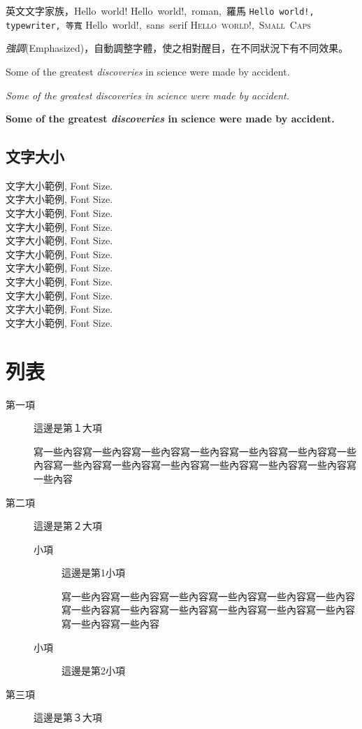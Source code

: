 \hbox{英文文字家族，Hello world!}
{\LARGE
    \hbox{\textrm{Hello world!, roman, 羅馬}}
    \hbox{\texttt{Hello world!, typewriter, 等寬}}
    \hbox{\textsf{Hello world!, sans serif}}
    \hbox{\textsc{Hello world!, Small Caps}}
}

\emph{強調}(Emphasized)，自動調整字體，使之相對醒目，在不同狀況下有不同效果。

Some of the greatest \emph{discoveries}
in science
were made by accident.

\textit{Some of the greatest \emph{discoveries}
    in science
    were made by accident.}

\textbf{Some of the greatest \emph{discoveries}
    in science
    were made by accident.}

\subsection{文字大小}
文字大小範例, Font Size.\\
{\tiny 文字大小範例, Font Size.}\\
{\scriptsize 文字大小範例, Font Size.}\\
{\footnotesize 文字大小範例, Font Size.}\\
{\small 文字大小範例, Font Size.}\\
{\normalsize 文字大小範例, Font Size.}\\
{\large 文字大小範例, Font Size.}\\
{\Large 文字大小範例, Font Size.}\\
{\LARGE 文字大小範例, Font Size.}\\
{\huge 文字大小範例, Font Size.} \\
{\Huge 文字大小範例, Font Size.}

\newpage

\section{列表} \label{sec_item}

\begin{description}
    \item[第一項] 這邊是第１大項
          \par 寫一些內容寫一些內容寫一些內容寫一些內容寫一些內容寫一些內容寫一些內容寫一些內容寫一些內容寫一些內容寫一些內容寫一些內容寫一些內容寫一些內容
    \item[第二項] 這邊是第２大項
          \begin{description}
              \item[小項] 這邊是第1小項
                    \par 寫一些內容寫一些內容寫一些內容寫一些內容寫一些內容寫一些內容寫一些內容寫一些內容寫一些內容寫一些內容寫一些內容寫一些內容寫一些內容寫一些內容
              \item[小項] 這邊是第2小項
          \end{description}
    \item[第三項] 這邊是第３大項
\end{description}

